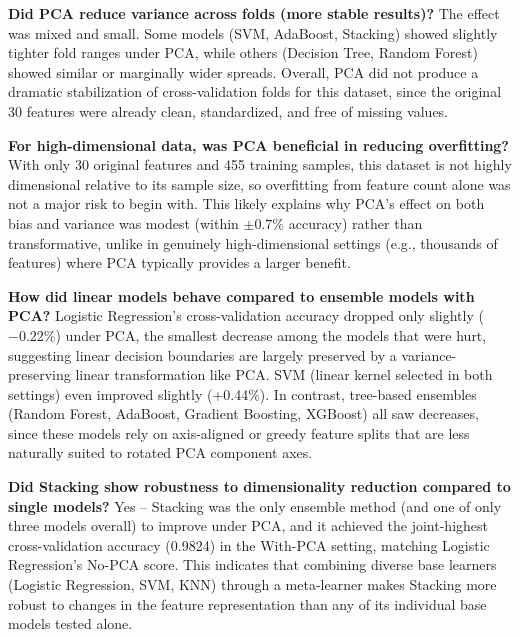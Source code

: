\documentclass[12pt,a4paper]{article}
\begin{document}
\textbf{Did PCA reduce variance across folds (more stable results)?} The effect was mixed and small. Some models (SVM, AdaBoost, Stacking) showed slightly tighter fold ranges under PCA, while others (Decision Tree, Random Forest) showed similar or marginally wider spreads. Overall, PCA did not produce a dramatic stabilization of cross-validation folds for this dataset, since the original 30 features were already clean, standardized, and free of missing values.

\textbf{For high-dimensional data, was PCA beneficial in reducing overfitting?} With only 30 original features and 455 training samples, this dataset is not highly dimensional relative to its sample size, so overfitting from feature count alone was not a major risk to begin with. This likely explains why PCA's effect on both bias and variance was modest (within $\pm0.7\%$ accuracy) rather than transformative, unlike in genuinely high-dimensional settings (e.g., thousands of features) where PCA typically provides a larger benefit.

\textbf{How did linear models behave compared to ensemble models with PCA?} Logistic Regression's cross-validation accuracy dropped only slightly ($-0.22\%$) under PCA, the smallest decrease among the models that were hurt, suggesting linear decision boundaries are largely preserved by a variance-preserving linear transformation like PCA. SVM (linear kernel selected in both settings) even improved slightly (+0.44\%). In contrast, tree-based ensembles (Random Forest, AdaBoost, Gradient Boosting, XGBoost) all saw decreases, since these models rely on axis-aligned or greedy feature splits that are less naturally suited to rotated PCA component axes.

\textbf{Did Stacking show robustness to dimensionality reduction compared to single models?} Yes -- Stacking was the only ensemble method (and one of only three models overall) to improve under PCA, and it achieved the joint-highest cross-validation accuracy (0.9824) in the With-PCA setting, matching Logistic Regression's No-PCA score. This indicates that combining diverse base learners (Logistic Regression, SVM, KNN) through a meta-learner makes Stacking more robust to changes in the feature representation than any of its individual base models tested alone.
\end{document}
